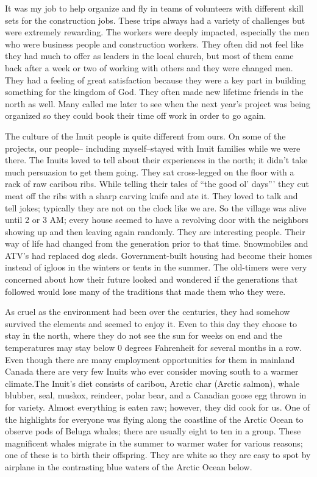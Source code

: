 \documentclass[twoside, 12pt]{book}
\begin{document}
It was my job to help organize and fly in teams of volunteers with different skill sets for the construction jobs. These trips always had a variety of challenges but were extremely rewarding. The workers were deeply impacted, especially the men who were business people and construction workers. They often did not feel like they had much to offer as leaders in the local church, but most of them came back after a week or two of working with others and they were changed men. They had a feeling of great satisfaction because they were a key part in building something for the kingdom of God. They often made new lifetime friends in the north as well. Many called me later to see when the next year’s project was being organized so they could book their time off work in order to go again.

The culture of the Inuit people is quite different from ours. On some of the projects, our people-- including myself--stayed with Inuit families while we were there. The Inuits loved to tell about their experiences in the north; it didn’t take much persuasion to get them going. They sat cross-legged on the floor with a rack of raw caribou ribs. While telling their tales of “the good ol’ days”' they cut meat off the ribs with a sharp carving knife and ate it. They loved to talk and tell jokes; typically they are not on the clock like we are. So the village was alive until 2 or 3 AM; every house seemed to have a revolving door with the neighbors showing up and then leaving again randomly. They are interesting people. Their way of life had changed from the generation prior to that time. Snowmobiles and ATV's had replaced dog sleds. Government-built housing had become their homes instead of igloos in the winters or tents in the summer. The old-timers were very concerned about how their future looked and wondered if the generations that followed would lose many of the traditions that made them who they were. 

As cruel as the environment had been over the centuries, they had somehow survived the elements and seemed to enjoy it. Even to this day they choose to stay in the north, where they do not see the sun for weeks on end and the temperatures may stay below 0 degrees Fahrenheit for several months in a row. Even though there are many employment opportunities for them in mainland Canada there are very few Inuits who ever consider moving south to a warmer climate.The Inuit's diet consists of caribou, Arctic char (Arctic salmon), whale blubber, seal, muskox, reindeer, polar bear, and a Canadian goose egg thrown in for variety. Almost everything is eaten raw; however, they did cook for us. One of the highlights for everyone was flying along the coastline of the Arctic Ocean to observe pods of Beluga whales; there are usually eight to ten in a group. These magnificent whales migrate in the summer to warmer water for various reasons; one of these is to birth their offspring. They are white so they are easy to spot by airplane in the contrasting blue waters of the Arctic Ocean below.
\end{document}

